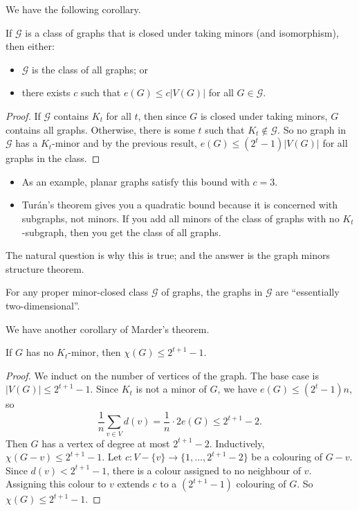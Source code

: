 \documentclass[main.tex]{subfiles}
\begin{document}
We have the following corollary.
\begin{corollary}
  If $\mathcal G$ is a class of graphs that is closed under taking minors
  (and isomorphism), then either:
  \begin{itemize}
    \item $\mathcal G$ is the class of all graphs; or
    \item there exists $c$ such that $e(G)\leq c|V(G)|$ for all $G\in\mathcal G$.
  \end{itemize}
\end{corollary}
\begin{proof}
  If $\mathcal G$ contains $K_t$ for all $t$, then since $G$ is closed under
  taking minors, $G$ contains all graphs.
  Otherwise, there is some $t$ such that $K_t\notin\mathcal G$.
  So no graph in $\mathcal G$ has a $K_t$-minor and by the previous result,
  $e(G)\leq (2^t-1)|V(G)|$ for all graphs in the class.
\end{proof}
\begin{remark*}
  \listhack
  \begin{itemize}
    \item As an example, planar graphs satisfy this bound with $c = 3$.

    \item Tur\'an's theorem gives you a quadratic bound because it is concerned
      with subgraphs, not minors.
      If you add all minors of the class of graphs with no $K_t$-subgraph,
      then you get the class of all graphs.
  \end{itemize}
\end{remark*}
The natural question is why this is true; and the answer is the graph minors
structure theorem.
\begin{theorem}
  For any proper minor-closed class $\mathcal G$ of graphs, the graphs in
  $\mathcal G$ are ``essentially two-dimensional''.
\end{theorem}
We have another corollary of Marder's theorem.
\begin{corollary}
  If $G$ has no $K_t$-minor, then $\chi(G)\leq 2^{t+1}-1$.
\end{corollary}
\begin{proof}
  We induct on the number of vertices of the graph.
  The base case is $|V(G)|\leq 2^{t+1}-1$.
  Since $K_t$ is not a minor of $G$, we have $e(G)\leq(2^t-1)n$, so
  \[
    \frac{1}{n}\sum_{v\in V} d(v) = \frac{1}{n}\cdot 2e(G)\leq 2^{t+1}-2.
  \]
  Then $G$ has a vertex of degree at most $2^{t+1}-2$.
  Inductively, $\chi(G-v)\leq 2^{t+1}-1$.
  Let $c:V - \{v\}\to\{1,\ldots,2^{t+1}-2\}$ be a colouring of $G-v$.
  Since $d(v) < 2^{t+1}-1$, there is a colour assigned to no neighbour of $v$.
  Assigning this colour to $v$ extends $c$ to a $(2^{t+1}-1)$ colouring of $G$.
  So $\chi(G)\leq 2^{t+1}-1$.
\end{proof}
\end{document}
